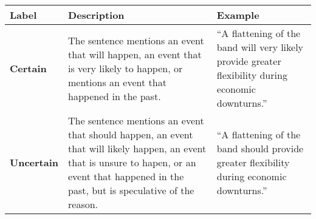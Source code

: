 \begin{table*}
    \caption{}
    \vspace{1em}
    \begin{tabular}{p{}p{}p{}}
    \toprule
    \textbf{Label} & \textbf{Description} & \textbf{Example}\\
    \midrule
    \textbf{Certain} & The sentence mentions an event that will happen, an event that is very likely to happen, or mentions an event that happened in the past. & “A flattening of the band will very likely provide greater flexibility during economic downturns.” \\
    \midrule
    \textbf{Uncertain} & The sentence mentions an event that should happen, an event that will likely happen, an event that is unsure to hapen, or an event that happened in the past, but is speculative of the reason. & “A flattening of the band should provide greater flexibility during economic downturns.” \\
    \bottomrule
    \end{tabular}
    \label{tb:mas_certainty_guide}
    \end{table*}